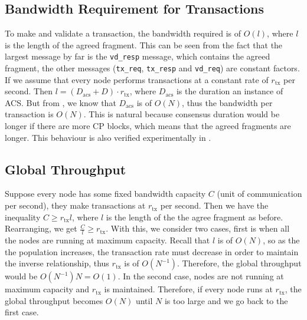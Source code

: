 
\subsection{Bandwidth Requirement for Transactions}
To make and validate a transaction, the bandwidth required is of $O(l)$,
where $l$ is the length of the agreed fragment.
This can be seen from the fact that the largest message by far is the \texttt{vd\_resp} message,
which contains the agreed fragment,
the other messages (\texttt{tx\_req}, \texttt{tx\_resp} and \texttt{vd\_req}) are constant factors.
If we assume that every node performs transactions at a constant rate of $r_{\text{tx}}$ per second.
Then $l = (D_{\text{acs}} + D) \cdot r_{\text{tx}}$, where $D_{\text{acs}}$ is the duration an instance of ACS.
But from , we know that $D_{\text{acs}}$ is of $O(N)$, thus the bandwidth per transaction is $O(N)$.
This is natural because consensus duration would be longer if there are more CP blocks, which means that the agreed fragments are longer.
This behaviour is also verified experimentally in .

\subsection{Global Throughput}
Suppose every node has some fixed bandwidth capacity $C$ (unit of communication per second),
they make transactions at $r_{\text{tx}}$ per second.
Then we have the inequality $C \ge r_{\text{tx}} l$, where $l$ is the length of the the agree fragment as before.
Rearranging, we get $\frac{C}{l} \ge r_{\text{tx}}$.
With this, we consider two cases, first is  when all the nodes are running at maximum capacity.
Recall that $l$ is of $O(N)$, so as the the population increases, 
the transaction rate must decrease in order to maintain the inverse relationship,
thus $r_\text{tx}$ is of $O(N^{-1})$. %
Therefore, the global throughput would be $O(N^{-1})N = O(1)$.
In the second case, nodes are not running at maximum capacity and $r_{\text{tx}}$ is maintained.
Therefore, if every node runs at $r_{\text{tx}}$,
the global throughput becomes $O(N)$ until $N$ is too large and we go back to the first case.

